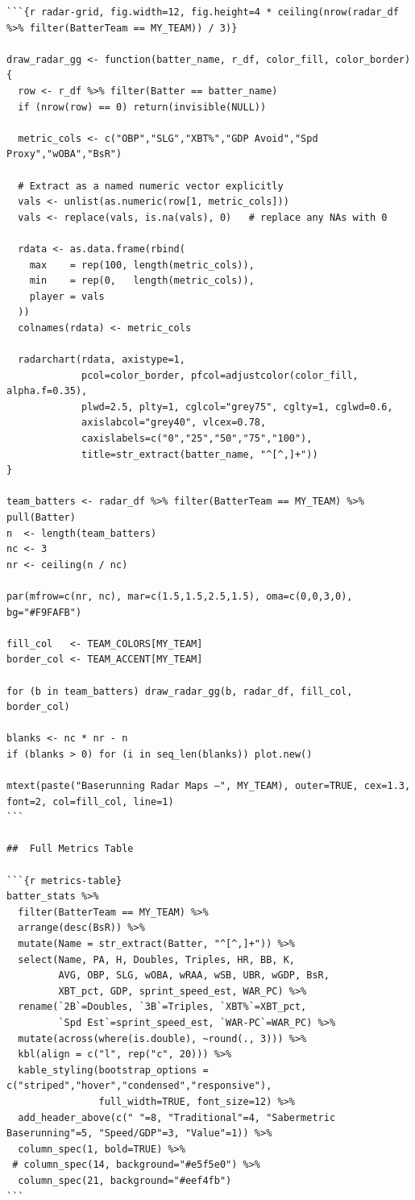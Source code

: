 \documentclass[
]{article}
\begin{document}
\begin{verbatim}
```{r radar-grid, fig.width=12, fig.height=4 * ceiling(nrow(radar_df %>% filter(BatterTeam == MY_TEAM)) / 3)}

draw_radar_gg <- function(batter_name, r_df, color_fill, color_border) {
  row <- r_df %>% filter(Batter == batter_name)
  if (nrow(row) == 0) return(invisible(NULL))
  
  metric_cols <- c("OBP","SLG","XBT%","GDP Avoid","Spd Proxy","wOBA","BsR")
  
  # Extract as a named numeric vector explicitly
  vals <- unlist(as.numeric(row[1, metric_cols]))
  vals <- replace(vals, is.na(vals), 0)   # replace any NAs with 0
  
  rdata <- as.data.frame(rbind(
    max    = rep(100, length(metric_cols)),
    min    = rep(0,   length(metric_cols)),
    player = vals
  ))
  colnames(rdata) <- metric_cols

  radarchart(rdata, axistype=1,
             pcol=color_border, pfcol=adjustcolor(color_fill, alpha.f=0.35),
             plwd=2.5, plty=1, cglcol="grey75", cglty=1, cglwd=0.6,
             axislabcol="grey40", vlcex=0.78,
             caxislabels=c("0","25","50","75","100"),
             title=str_extract(batter_name, "^[^,]+"))
}

team_batters <- radar_df %>% filter(BatterTeam == MY_TEAM) %>% pull(Batter)
n  <- length(team_batters)
nc <- 3
nr <- ceiling(n / nc)

par(mfrow=c(nr, nc), mar=c(1.5,1.5,2.5,1.5), oma=c(0,0,3,0), bg="#F9FAFB")

fill_col   <- TEAM_COLORS[MY_TEAM]
border_col <- TEAM_ACCENT[MY_TEAM]

for (b in team_batters) draw_radar_gg(b, radar_df, fill_col, border_col)

blanks <- nc * nr - n
if (blanks > 0) for (i in seq_len(blanks)) plot.new()

mtext(paste("Baserunning Radar Maps —", MY_TEAM), outer=TRUE, cex=1.3, font=2, col=fill_col, line=1)
```

##  Full Metrics Table

```{r metrics-table}
batter_stats %>%
  filter(BatterTeam == MY_TEAM) %>%
  arrange(desc(BsR)) %>%
  mutate(Name = str_extract(Batter, "^[^,]+")) %>%
  select(Name, PA, H, Doubles, Triples, HR, BB, K,
         AVG, OBP, SLG, wOBA, wRAA, wSB, UBR, wGDP, BsR,
         XBT_pct, GDP, sprint_speed_est, WAR_PC) %>%
  rename(`2B`=Doubles, `3B`=Triples, `XBT%`=XBT_pct,
         `Spd Est`=sprint_speed_est, `WAR-PC`=WAR_PC) %>%
  mutate(across(where(is.double), ~round(., 3))) %>%
  kbl(align = c("l", rep("c", 20))) %>%
  kable_styling(bootstrap_options = c("striped","hover","condensed","responsive"),
                full_width=TRUE, font_size=12) %>%
  add_header_above(c(" "=8, "Traditional"=4, "Sabermetric Baserunning"=5, "Speed/GDP"=3, "Value"=1)) %>%
  column_spec(1, bold=TRUE) %>%
 # column_spec(14, background="#e5f5e0") %>%
  column_spec(21, background="#eef4fb")
```


\end{verbatim}
\end{document}
